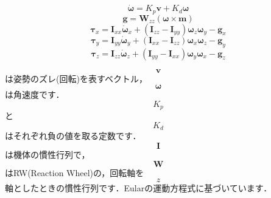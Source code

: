 
$$ \dot{\boldsymbol{\omega}} = K_p \boldsymbol{v} + K_d \boldsymbol{\omega}$$
$$ \boldsymbol{g} = \boldsymbol{W}_{zz} ( \boldsymbol{\omega} \times \boldsymbol{m} ) $$
$$ \boldsymbol{\tau}_x = \boldsymbol{I}_{xx}  \dot{\boldsymbol{\omega}}_x  + (\boldsymbol{I}_{zz} - \boldsymbol{I}_{yy})  \boldsymbol{\omega}_z  \boldsymbol{\omega}_y - \boldsymbol{g}_x $$
$$ \boldsymbol{\tau}_y = \boldsymbol{I}_{yy}  \dot{\boldsymbol{\omega}}_y  + (\boldsymbol{I}_{xx} - \boldsymbol{I}_{zz})  \boldsymbol{\omega}_x  \boldsymbol{\omega}_z - \boldsymbol{g}_y $$
$$ \boldsymbol{\tau}_z = \boldsymbol{I}_{zz}  \dot{\boldsymbol{\omega}}_z  + (\boldsymbol{I}_{yy} - \boldsymbol{I}_{xx})  \boldsymbol{\omega}_y  \boldsymbol{\omega}_x - \boldsymbol{g}_z $$

$$\boldsymbol{v}$$は姿勢のズレ(回転)を表すベクトル，$$\boldsymbol{\omega}$$は角速度です．$$K_p$$と$$K_d$$はそれぞれ負の値を取る定数です．$$\boldsymbol{I}$$は機体の慣性行列で，$$\boldsymbol{W}$$はRW(Reaction Wheel)の，回転軸を$$z$$軸としたときの慣性行列です．Eularの運動方程式に基づいています．



